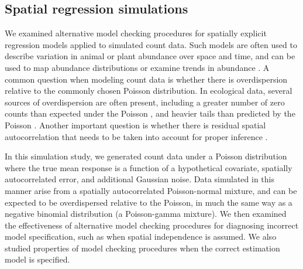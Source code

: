 \documentclass[12pt,english]{article}
\begin{document}
\begin{spacing}{1.9}
\subsection{Spatial regression simulations}

We examined alternative model checking procedures for spatially
explicit regression models applied to simulated count data.  Such
models are often used to describe variation in animal or plant
abundance over space and time, and can be used to map abundance
distributions or examine trends in abundance
\citep[e.g.,][]{SauerLink2011,ConnEtAl2014}.  A common question when
modeling count data is whether there is overdispersion relative to the
commonly chosen Poisson distribution.  In ecological data, several
sources of overdispersion are often present, including a greater
number of zero counts than expected under the Poisson \citep[zero
inflation;][]{AgarwalEtAl2002}, and heavier tails than predicted by
the Poisson \citep{PottsElith2006,VerHoefBoveng2007}.  Another
important question is whether there is residual spatial
autocorrelation that needs to be taken into account for proper
inference \citep{Legendre1993,LichsteinEtAl2002}.

In this simulation study, we generated count data under a Poisson
distribution where the true mean response is a function of a
hypothetical covariate, spatially autocorrelated error, and additional
Gaussian noise.  Data simulated in this manner arise from a spatially
autocorrelated Poisson-normal mixture, and can be expected to be
overdispersed relative to the Poisson, in much the same way as a
negative binomial distribution (a Poisson-gamma mixture).  We then
examined the effectiveness of alternative model checking procedures
for diagnosing incorrect model specification, such as when spatial
independence is assumed.  We also studied properties of model checking
procedures when the correct estimation model is specified.


\end{spacing}
\end{document}
